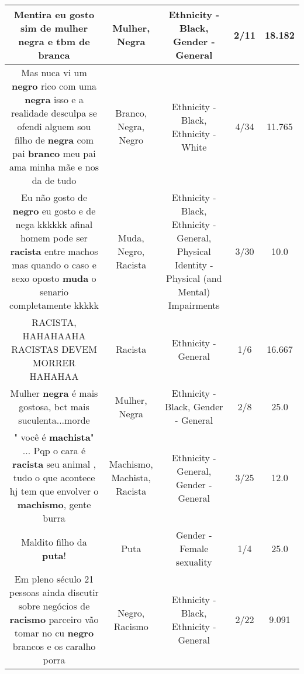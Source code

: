\documentclass[11pt]{article}
\newlength\mylength
\begin{document}
\begin{center}
\begin{longtable}{|C{.65\mylength}|C{.30\mylength}|C{.12\mylength}|C{.12\mylength}|C{.12\mylength}|}
  \small Mentira eu gosto sim de \textbf{mulher} \textbf{negra} e tbm de branca\normalsize   & Mulher, Negra & Ethnicity - Black, Gender - General & 2/11 & 18.182 \\  \hline
  \small Mas nuca vi um \textbf{negro} rico com uma \textbf{negra} isso e a realidade desculpa se ofendi alguem sou filho de \textbf{negra} com pai \textbf{branco} meu pai ama minha mãe e nos da de tudo\normalsize   & Branco, Negra, Negro & Ethnicity - Black, Ethnicity - White & 4/34 & 11.765 \\  \hline
  \small Eu não gosto de \textbf{negro} eu gosto e de nega kkkkkk afinal homem pode ser \textbf{racista} entre machos mas quando o caso e sexo oposto \textbf{muda} o senario completamente kkkkk\normalsize   & Muda, Negro, Racista & Ethnicity - Black, Ethnicity - General, Physical Identity - Physical (and Mental) Impairments & 3/30 & 10.0 \\  \hline
  \small RACISTA, HAHAHAAHA RACISTAS DEVEM MORRER HAHAHAA\normalsize   & Racista & Ethnicity - General & 1/6 & 16.667 \\  \hline
  \small Mulher \textbf{negra} é mais gostosa, bct  mais suculenta...morde\normalsize   & Mulher, Negra & Ethnicity - Black, Gender - General & 2/8 & 25.0 \\  \hline
  \small " você é \textbf{machista}" ... Pqp o cara é \textbf{racista} seu animal , tudo o que acontece hj tem que envolver o \textbf{machismo}, gente burra\normalsize   & Machismo, Machista, Racista & Ethnicity - General, Gender - General & 3/25 & 12.0 \\  \hline
  \small Maldito filho da \textbf{puta}!\normalsize   & Puta & Gender - Female sexuality & 1/4 & 25.0 \\  \hline
  \small Em pleno século 21 pessoas ainda discutir sobre negócios de \textbf{racismo} parceiro vão tomar no cu \textbf{negro} brancos e os caralho porra\normalsize   & Negro, Racismo & Ethnicity - Black, Ethnicity - General & 2/22 & 9.091 \\  \hline

\end{longtable}
\end{center}
\end{document}
